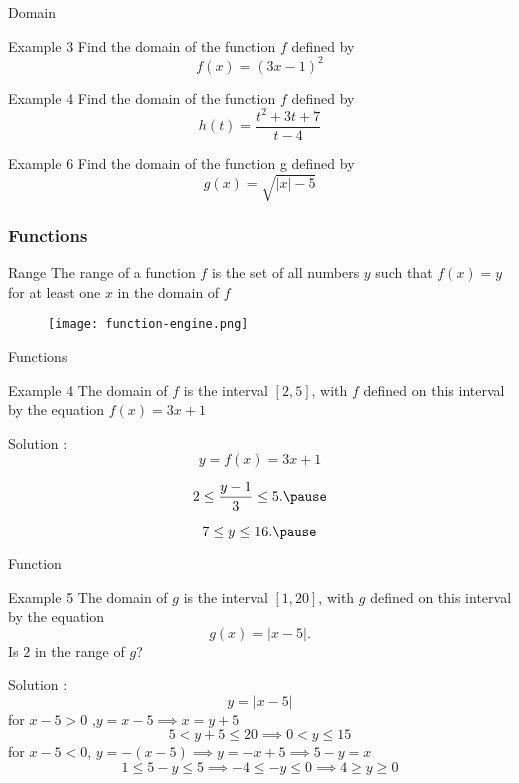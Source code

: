 \begin{frame}{Domain}
  \begin{exampleblock}{Example 3}
    Find the domain of the function \(f\)  defined by \[f (x) = (3x-1)^2 \]
  \end{exampleblock}
  \begin{exampleblock}{Example 4}
    Find the domain of the function \(f\) defined by \[h (t) = \frac{t^2 + 3t + 7}{t-4} \]
  \end{exampleblock}
  \begin{exampleblock}{Example 6}
    Find the domain of the function g defined by \[g(x) = \sqrt{|x|-5}\]
  \end{exampleblock}
\end{frame}
\begin{frame}
  \frametitle{Functions}
  \begin{block}{Range}
    The range of a function \(f\) is the set of all numbers \(y\) such that \(f (x) = y\) for at least one \(x\) in the domain of \(f\)
  \end{block}
  \begin{figure}[h]    
    \centering
    \texttt{[image: function-engine.png]}
\end{figure}
\end{frame}
\begin{frame}{Functions}
  \begin{exampleblock}{Example 4}
The domain of \(f\) is the interval \( [2, 5] \), with \(f\) defined on this interval by the equation \(f (x) = 3x + 1\)
  \end{exampleblock}
  Solution : \pause 
  \[
  y = f(x) = 3x+1 \]     \pause

  \[  2 \leq \frac{y-1}{3} \leq 5.  \pause
  \]

  \[  7 \leq y \leq 16.   \pause
   \]
\end{frame}
\begin{frame}{Function}
  \begin{exampleblock}{Example 5}
    The domain of \(g\) is the interval \([1,20]\), with \(g\) defined on this interval by
    the equation
    \[
    g(x) = |x - 5|.
    \]
    Is \(2\) in the range of \(g\)?
  \end{exampleblock}
  Solution :  \pause 
  \[ y =  |x-5| \]
  for \(x-5>0 \) ,\(y = x-5 \implies x = y+5 \)  
  \[ 5 < y+5 \leq 20  \implies  0 < y \leq 15 \]
  for \(x-5<0 \), \(y = -(x-5) \implies y = -x+5 \implies 5-y = x \)
  \[ 1 \leq 5-y \leq 5  \implies -4 \leq -y \leq 0 \implies  4 \geq y \geq 0 \] 
\end{frame}

